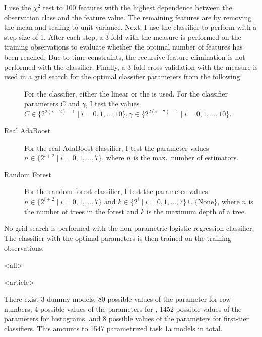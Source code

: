 \begin{frame}
\begin{description}
    I use the $\chi^2$ test to  100 features with the highest
    dependence between the observation class and the feature value. The
    remaining features are  by removing the mean and scaling
    to unit variance. Next, I use the classifier to perform  with a step size of 1. After each step, a 3-fold
     with the  measure is performed on the
    training observations to evaluate whether the optimal number of features
    has been reached. Due to time constraints, the recursive feature
    elimination is not performed with the  classifier.  Finally, a
    3-fold cross-validation with the  measure is used in a grid
    search for the optimal classifier parameters from the following:
    \begin{description}
      \item[]
        For the  classifier, either the linear or the   is used. For the classifier
        parameters $C$ and $\gamma$, I test the values $C\in\{2^{2(i-2)-1}\mid
        i=0,1,\ldots,10\}, \gamma\in\{2^{2(i-7)-1}\mid i=0,1,\ldots,10\}$.
      \item[Real AdaBoost]
        For the real AdaBoost classifier, I test the parameter values
        $n\in\{2^{i+2}\mid i=0,1,\ldots,7\}$, where $n$ is the max.\ number
        of estimators.
      \item[Random Forest]
        For the random forest classifier, I test the parameter values
        $n\in\{2^{i+2}\mid i=0,1,\ldots,7\}$ and
        $k\in\{2^i\mid i=0,1,\ldots,7\}\cup\{\text{None}\}$,
        where $n$ is the number of trees in the forest and $k$ is the maximum
        depth of a tree.
    \end{description}
    No grid search is performed with the non-parametric logistic regression
    classifier. The classifier with the optimal parameters is then trained on
    the training observations.

\mode
<all>

\end{description}
\end{frame}

\mode
<article>

There exist 3 dummy models, 80 possible values of the parameter for row numbers,
4 possible values of the parameters for , 1452 possible values of the
parameters for histograms, and 8 possible values of the parameters for
first-tier classifiers. This amounts to 1547 parametrized task 1a models in
total.

